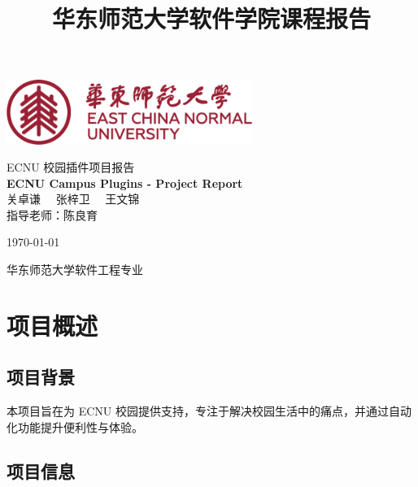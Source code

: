 \documentclass[14pt,a4paper,UTF8,twoside]{article}
\date{} %
\title{华东师范大学软件学院课程报告} %
\begin{document}
    \begin{titlepage}
        \centering
        \vspace*{2cm}

        \includegraphics[width=0.6\textwidth]{img/ECNULogo}\par\vspace{1cm}

        {\heiti {} ECNU 校园插件项目报告}\\[1.5cm]

        {\bfseries{} ECNU Campus Plugins - Project Report}\\[1.5cm]

        {\kaishu {} 关卓谦 \ \ 张梓卫 \ \ 王文锦}\\[1cm]

        { 指导老师：陈良育}\\[1cm]

        \vfill

        { \today}

        \vspace{1cm}

        { 华东师范大学软件工程专业}

    \end{titlepage}

    \newpage{}

    \tableofcontents

    \newpage{}


    \section{项目概述}

    \subsection{项目背景}

    本项目旨在为 ECNU 校园提供支持，专注于解决校园生活中的痛点，并通过自动化功能提升便利性与体验。

    \subsection{项目信息}
\end{document}
